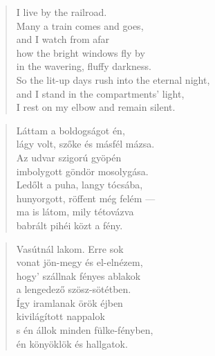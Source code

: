 \bigskip



\begin{verse}
  I live by the railroad. \\
  Many a train comes and goes, \\
  and I watch from afar \\
  how the bright windows fly by \\
  in the wavering, fluffy darkness. \\
  So the lit-up days rush into the eternal night, \\
  and I stand in the compartments' light, \\
  I rest on my elbow and remain silent.
\end{verse}

\newpage


\vspace*{-15mm}
\centeredornament




\begin{verse}
  Láttam a boldogságot én, \\
  lágy volt, szőke és másfél mázsa. \\
  Az udvar szigorú gyöpén \\
  imbolygott göndör mosolygása. \\
  Ledőlt a puha, langy tócsába, \\
  hunyorgott, röffent még felém --- \\
  ma is látom, mily tétovázva \\
  babrált pihéi közt a fény.
\end{verse}

\bigskip



\begin{verse}
  Vasútnál lakom. Erre sok \\
  vonat jön-megy és el-elnézem, \\
  hogy' szállnak fényes ablakok \\
  a lengedező szösz-sötétben. \\
  Így iramlanak örök éjben \\
  kivilágított nappalok \\
  s én állok minden fülke-fényben, \\
  én könyöklök és hallgatok.
\end{verse}
